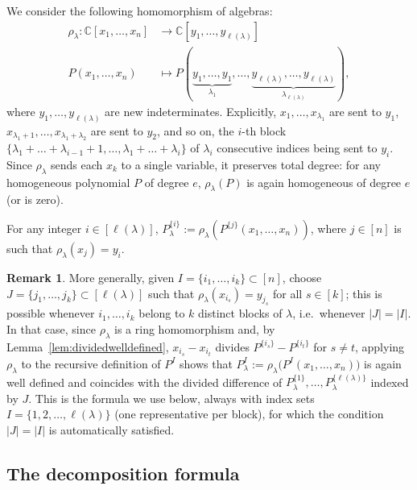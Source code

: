 \documentclass[12pt]{amsart}
\theoremstyle{definition}
\newtheorem{remark}[theorem]{Remark}
\DeclareMathOperator{\len}{\ell}
\begin{document}
We consider the following homomorphism of algebras:
\begin{equation}
\label{eq:rholambda}
\begin{aligned}
\rho_\lambda : \mathbb{C}[x_1,\dots,x_n] &\longrightarrow \mathbb{C}[y_1,\dots,y_{\len(\lambda)}] \\
P(x_1,\dots,x_n) &\longmapsto P(\underbrace{y_1,\dots,y_1}_{\lambda_1},\dots,\underbrace{y_{\len(\lambda)},\dots,y_{\len(\lambda)}}_{\lambda_{\len(\lambda)}}),
\end{aligned}
\end{equation}
where $y_1,\dots,y_{\len(\lambda)}$ are new indeterminates. Explicitly, $x_1,\dots,x_{\lambda_1}$ are sent to $y_1$, $x_{\lambda_1+1},\dots,x_{\lambda_1+\lambda_2}$ are sent to $y_2$, and so on, the $i$-th block $\{\lambda_1+\dots+\lambda_{i-1}+1,\dots,\lambda_1+\dots+\lambda_i\}$ of $\lambda_i$ consecutive indices being sent to $y_i$. Since $\rho_\lambda$ sends each $x_k$ to a single variable, it preserves total degree: for any homogeneous polynomial $P$ of degree $e$, $\rho_\lambda(P)$ is again homogeneous of degree $e$ (or is zero).

For any integer $i \in [\len(\lambda)]$, $P^{\{i\}}_\lambda := \rho_\lambda(P^{\{j\}}(x_1,\dots,x_n))$, where $j \in [n]$ is such that $\rho_\lambda(x_j) = y_i$.

\begin{remark}
\label{rem:rholambdaI}
More generally, given $I = \{i_1,\dots,i_k\} \subset [n]$, choose $J = \{j_1,\dots,j_k\} \subset [\len(\lambda)]$ such that $\rho_\lambda(x_{i_s}) = y_{j_s}$ for all $s \in [k]$; this is possible whenever $i_1,\dots,i_k$ belong to $k$ distinct blocks of $\lambda$, i.e.\ whenever $|J|=|I|$. In that case, since $\rho_\lambda$ is a ring homomorphism and, by Lemma~\ref{lem:dividedwelldefined}, $x_{i_s} - x_{i_t}$ divides $P^{\{i_s\}} - P^{\{i_t\}}$ for $s \ne t$, applying $\rho_\lambda$ to the recursive definition of $P^I$ shows that $P^I_\lambda := \rho_\lambda\big(P^I(x_1,\dots,x_n)\big)$ is again well defined and coincides with the divided difference of $P^{\{1\}}_\lambda,\dots,P^{\{\len(\lambda)\}}_\lambda$ indexed by $J$. This is the formula we use below, always with index sets $I = \{1,2,\dots,\len(\lambda)\}$ (one representative per block), for which the condition $|J|=|I|$ is automatically satisfied.
\end{remark}

\subsection{The decomposition formula}
\end{document}
